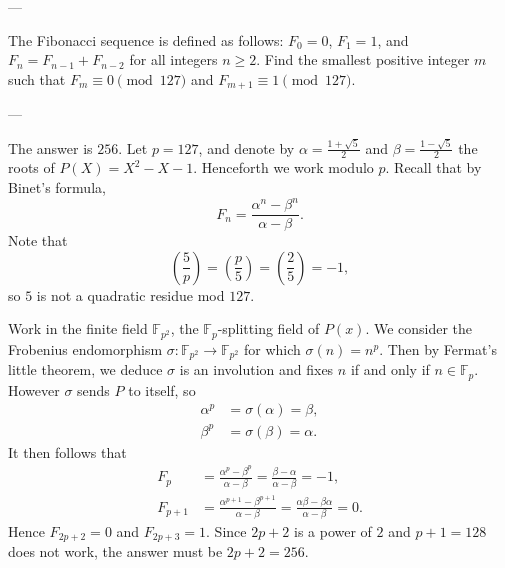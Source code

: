 
---

The Fibonacci sequence is defined as follows: $F_0=0$, $F_1=1$, and $F_n=F_{n-1}+F_{n-2}$ for all integers $n\ge2$. Find the smallest positive integer $m$ such that $F_m\equiv0\pmod{127}$ and $F_{m+1}\equiv1\pmod{127}$.

---

The answer is $256$. Let $p=127$,  and denote by $\alpha=\tfrac{1+\sqrt5}2$ and $\beta=\tfrac{1-\sqrt5}2$ the roots of $P(X)=X^2-X-1$. Henceforth we work modulo $p$. Recall that by Binet's formula, \[F_n=\frac{\alpha^n-\beta^n}{\alpha-\beta}.\]
Note that \[\left(\frac5p\right)=\left(\frac p5\right)=\left(\frac25\right)=-1,\]
so $5$ is not a quadratic residue mod $127$.

Work in the finite field $\mathbb F_{p^2}$, the $\mathbb F_p$-splitting field of $P(x)$. We consider the Frobenius endomorphism $\sigma:\mathbb F_{p^2}\to\mathbb F_{p^2}$ for which $\sigma(n)=n^p$. Then by Fermat's little theorem, we deduce $\sigma$ is an involution and fixes $n$ if and only if $n\in\mathbb F_p$. However $\sigma$ sends $P$ to itself, so
\begin{align*}
    \alpha^p&=\sigma(\alpha)=\beta,\\
    \beta^p&=\sigma(\beta)=\alpha.
\end{align*}
It then follows that 
\begin{align*}
    F_p&=\frac{\alpha^p-\beta^p}{\alpha-\beta}=\frac{\beta-\alpha}{\alpha-\beta}=-1,\\
    F_{p+1}&=\frac{\alpha^{p+1}-\beta^{p+1}}{\alpha-\beta}=\frac{\alpha\beta-\beta\alpha}{\alpha-\beta}=0.
\end{align*}
Hence $F_{2p+2}=0$ and $F_{2p+3}=1$. Since $2p+2$ is a power of $2$ and $p+1=128$ does not work, the answer must be $2p+2=256$.

